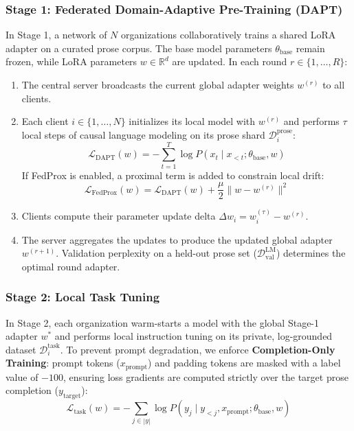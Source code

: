 \documentclass[11pt,a4paper]{article}
\begin{document}
\subsubsection{Stage 1: Federated Domain-Adaptive Pre-Training (DAPT)}
In Stage 1, a network of $N$ organizations collaboratively trains a shared LoRA adapter on a curated prose corpus. The base model parameters $\theta_{\text{base}}$ remain frozen, while LoRA parameters $w \in \mathbb{R}^d$ are updated. In each round $r \in \{1, \dots, R\}$:
\begin{enumerate}
    \item The central server broadcasts the current global adapter weights $w^{(r)}$ to all clients.
    \item Each client $i \in \{1, \dots, N\}$ initializes its local model with $w^{(r)}$ and performs $\tau$ local steps of causal language modeling on its prose shard $\mathcal{D}_i^{\text{prose}}$:
    \begin{equation}
        \mathcal{L}_{\text{DAPT}}(w) = -\sum_{t=1}^{T} \log P(x_t \mid x_{<t}; \theta_{\text{base}}, w)
    \end{equation}
    If FedProx is enabled, a proximal term is added to constrain local drift:
    \begin{equation}
        \mathcal{L}_{\text{FedProx}}(w) = \mathcal{L}_{\text{DAPT}}(w) + \frac{\mu}{2} \| w - w^{(r)} \|^2
    \end{equation}
    \item Clients compute their parameter update delta $\Delta w_i = w_i^{(\tau)} - w^{(r)}$.
    \item The server aggregates the updates to produce the updated global adapter $w^{(r+1)}$. Validation perplexity on a held-out prose set ($\mathcal{D}_{\text{val}}^{\text{LM}}$) determines the optimal round adapter.
\end{enumerate}

\subsubsection{Stage 2: Local Task Tuning}
In Stage 2, each organization warm-starts a model with the global Stage-1 adapter $w^*$ and performs local instruction tuning on its private, log-grounded dataset $\mathcal{D}_i^{\text{task}}$. To prevent prompt degradation, we enforce \textbf{Completion-Only Training}: prompt tokens ($x_{\text{prompt}}$) and padding tokens are masked with a label value of $-100$, ensuring loss gradients are computed strictly over the target prose completion ($y_{\text{target}}$):
\begin{equation}
    \mathcal{L}_{\text{task}}(w) = -\sum_{j \in |y|} \log P(y_j \mid y_{<j}, x_{\text{prompt}}; \theta_{\text{base}}, w)
\end{equation}
\end{document}

